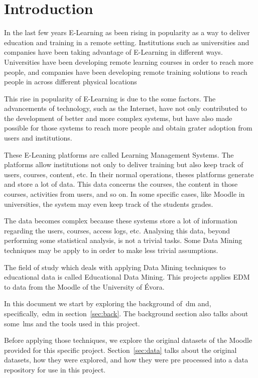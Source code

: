 \chapter{Introduction}

In the last few years E-Learning as been rising in popularity as a way to
deliver education and training in a remote setting. Institutions such as
universities and companies have been taking advantage of E-Learning in
different ways. Universities have been developing remote learning courses in
order to reach more people, and companies have been developing remote training
solutions to reach people in across different physical locations

This rise in popularity of E-Learning is due to the some factors. The
advancements of technology, such as the Internet, have not only contributed to
the development of better and more complex systems, but have also made possible
for those systems to reach more people and obtain grater adoption from users
and institutions.

These E-Leaning platforms are called Learning Management Systems. The platforms
allow institutions not only to deliver training but also keep track of users,
courses, content, etc. In their normal operations, theses platforms generate
and store a lot of data. This data concerns the courses, the content in those
courses, activities from users, and so on. In some specific cases, like Moodle
in universities, the system may even keep track of the students grades.

The data becomes complex because these systems store a lot of information
regarding the users, courses, access logs, etc. Analysing this data, beyond
performing some statistical analysis, is not a trivial tasks. Some Data Mining
techniques may be apply to in order to make less trivial assumptions.

The field of study which deals with applying Data Mining techniques to
educational data is called Educational Data Mining. This projects applies EDM
to data from the Moodle of the University of Évora.~\cite{ind_010, ind_011,
ind_013, ind_014, ind_015}

In this document we start by exploring the background of~\gls{dm} and,
specifically,~\gls{edm} in section~\ref{sec:back}. The background section also
talks about some~\gls{lms} and the tools used in this project.

Before applying those techniques, we explore the original datasets of the
Moodle provided for this specific project. Section~\ref{sec:data} talks about
the original datasets, how they were explored, and how they were pre processed
into a data repository for use in this project.

